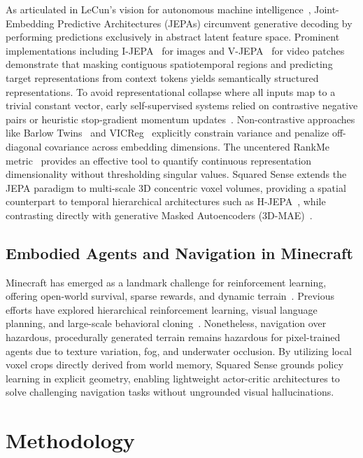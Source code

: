 \documentclass{svproc}
\begin{document}
As articulated in LeCun's vision for autonomous machine intelligence~\cite{lecun2022path}, Joint-Embedding Predictive Architectures (JEPAs) circumvent generative decoding by performing predictions exclusively in abstract latent feature space. Prominent implementations including I-JEPA~\cite{assran2023ijepa} for images and V-JEPA~\cite{bardes2024vjepa} for video patches demonstrate that masking contiguous spatiotemporal regions and predicting target representations from context tokens yields semantically structured representations. To avoid representational collapse where all inputs map to a trivial constant vector, early self-supervised systems relied on contrastive negative pairs or heuristic stop-gradient momentum updates~\cite{grill2020byol}. Non-contrastive approaches like Barlow Twins~\cite{zbontar2021barlow} and VICReg~\cite{bardes2022vicreg} explicitly constrain variance and penalize off-diagonal covariance across embedding dimensions. The uncentered RankMe metric~\cite{garrido2023rankme} provides an effective tool to quantify continuous representation dimensionality without thresholding singular values. Squared Sense extends the JEPA paradigm to multi-scale 3D concentric voxel volumes, providing a spatial counterpart to temporal hierarchical architectures such as H-JEPA~\cite{lecun2022path}, while contrasting directly with generative Masked Autoencoders (3D-MAE)~\cite{he2022mae}.

\subsection{Embodied Agents and Navigation in Minecraft}
Minecraft has emerged as a landmark challenge for reinforcement learning, offering open-world survival, sparse rewards, and dynamic terrain~\cite{guss2019minerl,fan2022minedojo,wang2023voyager}. Previous efforts have explored hierarchical reinforcement learning, visual language planning, and large-scale behavioral cloning~\cite{baker2022vpt,wang2023voyager}. Nonetheless, navigation over hazardous, procedurally generated terrain remains hazardous for pixel-trained agents due to texture variation, fog, and underwater occlusion. By utilizing local voxel crops directly derived from world memory, Squared Sense grounds policy learning in explicit geometry, enabling lightweight actor-critic architectures to solve challenging navigation tasks without ungrounded visual hallucinations.

\section{Methodology}
\end{document}

